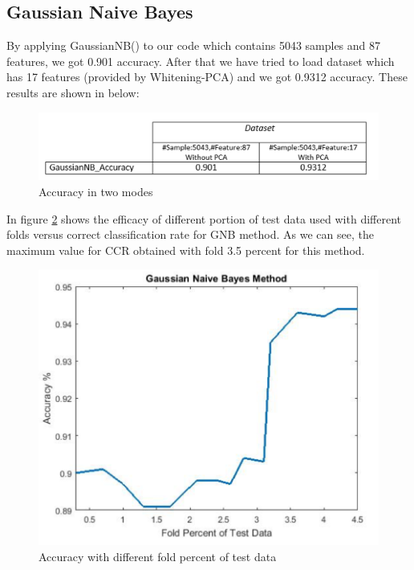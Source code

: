 \documentclass[journal,transmag]{IEEEtran}
\begin{document}
	\subsection{Gaussian Naive Bayes}
By applying GaussianNB()  to our code which contains 5043 samples and 87 features, we got 0.901 accuracy. After that we have tried to load dataset which has 17 features (provided by Whitening-PCA) and we got 0.9312 accuracy. These results are shown in below:	
\begin{figure}
\includegraphics[scale=.26]{figfoj1.png}
 \caption{Accuracy in two modes}
\label{fig_foj1}
\end{figure}
In figure \ref{fig_foj2} shows the efficacy of different portion of test data used with different folds versus correct classification rate for GNB method. As we can see, the maximum value for CCR obtained with fold 3.5 percent for this method. 
\begin{figure}
\includegraphics[scale=.38]{figfoj2.png}
 \caption{Accuracy with different fold percent of test data}
\label{fig_foj2}
\end{figure}
\end{document}
